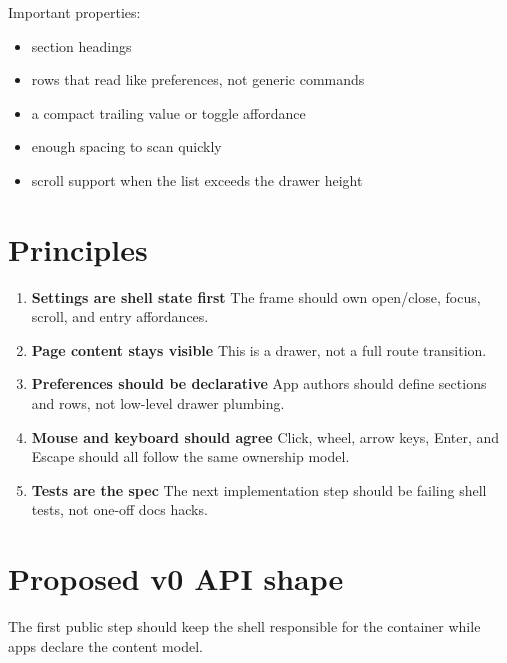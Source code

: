 Important properties:

\begin{itemize}
\tightlist
\item
  section headings
\item
  rows that read like preferences, not generic commands
\item
  a compact trailing value or toggle affordance
\item
  enough spacing to scan quickly
\item
  scroll support when the list exceeds the drawer height
\end{itemize}

\section{Principles}\label{record-057-principles}

\begin{enumerate}
\def\labelenumi{\arabic{enumi}.}
\item
  \textbf{Settings are shell state first} The frame should own open/close, focus, scroll, and entry affordances.
\item
  \textbf{Page content stays visible} This is a drawer, not a full route transition.
\item
  \textbf{Preferences should be declarative} App authors should define sections and rows, not low-level drawer plumbing.
\item
  \textbf{Mouse and keyboard should agree} Click, wheel, arrow keys, Enter, and Escape should all follow the same ownership model.
\item
  \textbf{Tests are the spec} The next implementation step should be failing shell tests, not one-off docs hacks.
\end{enumerate}

\section{Proposed v0 API shape}\label{record-057-proposed-v0-api-shape}

The first public step should keep the shell responsible for the container while apps declare the content model.

